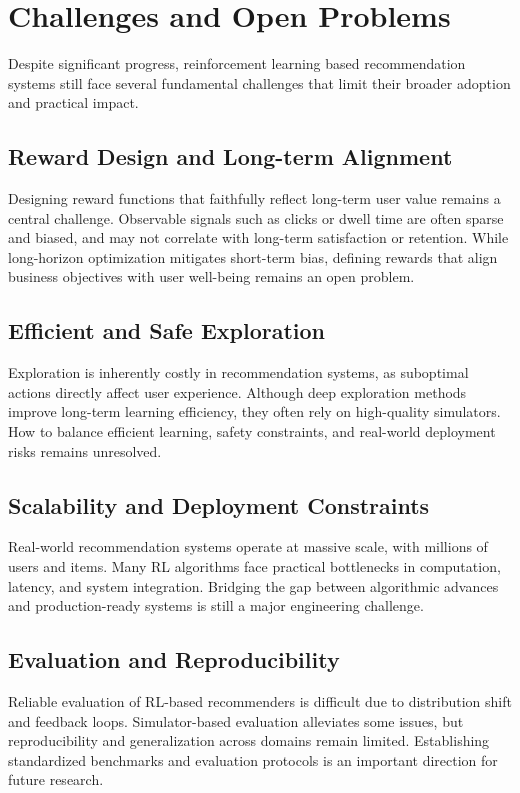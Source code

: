 \section{Challenges and Open Problems}

Despite significant progress, reinforcement learning based recommendation systems still face several fundamental challenges that limit their broader adoption and practical impact.

\subsection{Reward Design and Long-term Alignment}

Designing reward functions that faithfully reflect long-term user value remains a central challenge. Observable signals such as clicks or dwell time are often sparse and biased, and may not correlate with long-term satisfaction or retention. While long-horizon optimization mitigates short-term bias, defining rewards that align business objectives with user well-being remains an open problem.

\subsection{Efficient and Safe Exploration}

Exploration is inherently costly in recommendation systems, as suboptimal actions directly affect user experience. Although deep exploration methods improve long-term learning efficiency, they often rely on high-quality simulators. How to balance efficient learning, safety constraints, and real-world deployment risks remains unresolved.

\subsection{Scalability and Deployment Constraints}

Real-world recommendation systems operate at massive scale, with millions of users and items. Many RL algorithms face practical bottlenecks in computation, latency, and system integration. Bridging the gap between algorithmic advances and production-ready systems is still a major engineering challenge.

\subsection{Evaluation and Reproducibility}

Reliable evaluation of RL-based recommenders is difficult due to distribution shift and feedback loops. Simulator-based evaluation alleviates some issues, but reproducibility and generalization across domains remain limited. Establishing standardized benchmarks and evaluation protocols is an important direction for future research.
